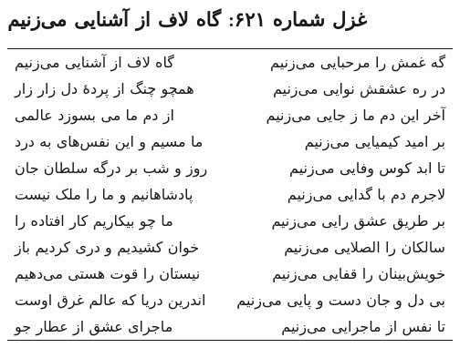 \begin{center}
\section*{غزل شماره ۶۲۱: گاه لاف از آشنایی می‌زنیم}
\label{sec:621}
\begin{longtable}{l p{0.5cm} r}
گاه لاف از آشنایی می‌زنیم
&&
گه غمش را مرحبایی می‌زنیم
\\
همچو چنگ از پردهٔ دل زار زار
&&
در ره عشقش نوایی می‌زنیم
\\
از دم ما می بسوزد عالمی
&&
آخر این دم ما ز جایی می‌زنیم
\\
ما مسیم و این نفس‌های به درد
&&
بر امید کیمیایی می‌زنیم
\\
روز و شب بر درگه سلطان جان
&&
تا ابد کوس وفایی می‌زنیم
\\
پادشاهانیم و ما را ملک نیست
&&
لاجرم دم با گدایی می‌زنیم
\\
ما چو بیکاریم کار افتاده را
&&
بر طریق عشق رایی می‌زنیم
\\
خوان کشیدیم و دری کردیم باز
&&
سالکان را الصلایی می‌زنیم
\\
نیستان را قوت هستی می‌دهیم
&&
خویش‌بینان را قفایی می‌زنیم
\\
اندرین دریا که عالم غرق اوست
&&
بی دل و جان دست و پایی می‌زنیم
\\
ماجرای عشق از عطار جو
&&
تا نفس از ماجرایی می‌زنیم
\\
\end{longtable}
\end{center}
